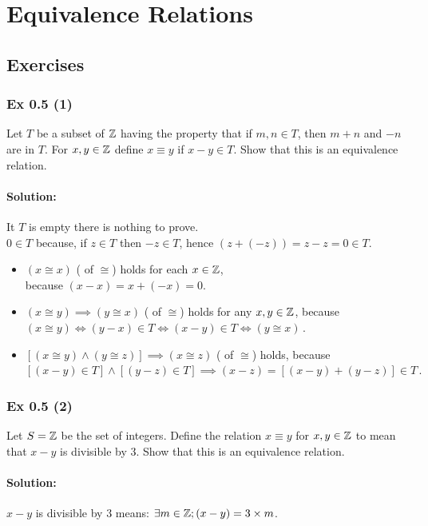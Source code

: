 {{%
\section{Equivalence Relations}\label{sec:0.5}	
\subsection*{Exercises}\label{sec:0.5_Exercises}
\subsubsection{Ex 0.5 (1)}\label{sec:Ex_0.5.1}
Let $T$ be a subset of $\mathbb{Z}$ having the property that if $m, n \in T$, then $m + n$ and $-n$ are in $T$.
For $x, y \in \mathbb{Z}$ define $x \equiv y$ if $x - y \in T$. Show that this is an equivalence relation.
%
%
\paragraph{Solution:}{
It $T$ is empty there is nothing to prove.\\ 
$0 \in T$ because, if $z \in T$ then $-z \in T$, hence $(z + (-z)) = z - z = 0 \in T$.\\
\begin{itemize}
\item $(x \cong x)$ ( of $\cong$) holds for each $x \in \mathbb{Z}$,\\ because $(x - x) = x + (-x) = 0$.
\item $(x \cong y) \implies (y \cong x)$ ( of $\cong$) holds for any $x, y \in \mathbb{Z}$, because
$(x \cong y) \iff (y - x) \in T  \iff (x - y) \in T \iff (y \cong x)\,.$
\item $[(x \cong y) \land (y \cong z)] \implies (x \cong z)$ ( of $\cong$) holds, because \\
$[(x - y) \in T] \land [(y - z) \in T] \implies (x - z) = [(x - y) + (y - z)] \in T\,.$   
\end{itemize}
}

\subsubsection{Ex 0.5 (2)}\label{sec:Ex_0.5.2}
Let $S = \mathbb{Z}$ be the set of integers. Define the relation $x \equiv y$ for $x, y \in \mathbb{Z}$ to mean
that $x - y$ is divisible by $3$. Show that this is an equivalence relation. 
%
%
\paragraph{Solution:}{
$x - y$ is divisible by $3$ means: $\exists m \in \mathbb{Z} ; (x-y) = 3 \times m$.  

}}}
